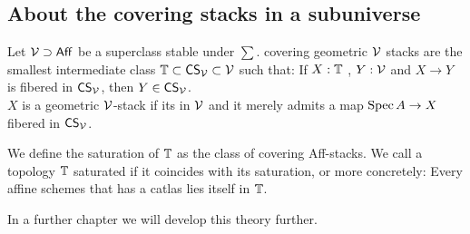 \subsection{About the covering stacks in a subuniverse}
\begin{definition}
	Let $\mathcal{V} \supset \mathsf{Aff}$ be a superclass stable under $\sum$. covering geometric $\mathcal{V}$ stacks are the smallest intermediate class $\mathbb{T} \subset \mathsf{CS}_{\mathcal{V}} \subset \mathcal{V}$ such that: If $X : \mathbb{T}$ ,  $Y : \mathcal{V}$ and $X \to Y$ is fibered in $\mathsf{CS}_{\mathcal{V}}$, then $Y \in \mathsf{CS}_{\mathcal{V}}$. \\
	$X$ is a geometric $\mathcal{V}$-stack if its in $\mathcal{V}$ and it merely admits a map $\operatorname{Spec} A \to X$ fibered in $\mathsf{CS}_{\mathcal{V}}$.
\end{definition}
\begin{definition}
	We define the saturation of $\mathbb{T}$ as the class of covering Aff-stacks. We call a topology $\mathbb{T}$ saturated if it coincides with its saturation, or more concretely: Every affine schemes that has a catlas lies itself in $\mathbb{T}$. \\ 
\end{definition}
In a further chapter we will develop this theory further.



